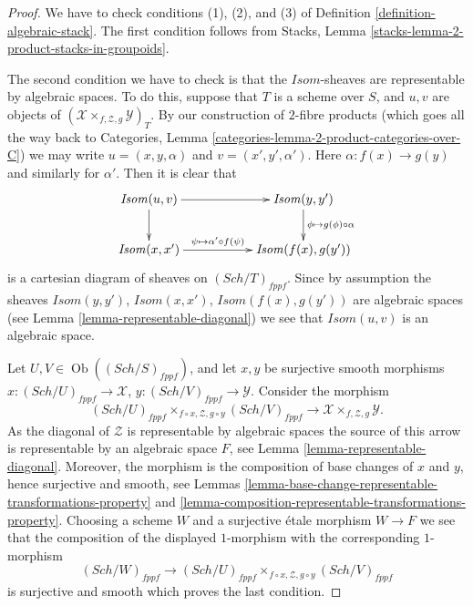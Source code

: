 \documentclass{stacks-project}
\theoremstyle{plain}
\theoremstyle{definition}
\theoremstyle{remark}
\numberwithin{equation}{subsection}
\def\Sch{\mathit{Sch}}
\def\Ob{\mathop{\mathrm{Ob}}\nolimits}
\begin{document}
\begin{proof}
We have to check conditions (1), (2), and (3) of
Definition \ref{definition-algebraic-stack}.
The first condition follows from
Stacks, Lemma \ref{stacks-lemma-2-product-stacks-in-groupoids}.

\medskip\noindent
The second condition we have to check is that the $\mathit{Isom}$-sheaves
are representable by algebraic spaces. To do this, suppose that
$T$ is a scheme over $S$, and $u, v$ are objects of
$(\mathcal{X} \times_{f, \mathcal{Z}, g} \mathcal{Y})_T$.
By our construction of $2$-fibre products (which goes all the way
back to
Categories, Lemma \ref{categories-lemma-2-product-categories-over-C})
we may write $u = (x, y, \alpha)$ and $v = (x', y', \alpha')$.
Here $\alpha : f(x) \to g(y)$ and similarly for $\alpha'$.
Then it is clear that
$$
\xymatrix{
\mathit{Isom}(u, v) \ar[d] \ar[rr] & &
\mathit{Isom}(y, y') \ar[d]^{\phi \mapsto g(\phi) \circ \alpha} \\
\mathit{Isom}(x, x') \ar[rr]^-{\psi \mapsto \alpha' \circ f(\psi)} & &
\mathit{Isom}(f(x), g(y'))
}
$$
is a cartesian diagram of sheaves on $(\Sch/T)_{fppf}$.
Since by assumption the sheaves
$\mathit{Isom}(y, y')$, $\mathit{Isom}(x, x')$, $\mathit{Isom}(f(x), g(y'))$
are algebraic spaces (see
Lemma \ref{lemma-representable-diagonal})
we see that $\mathit{Isom}(u, v)$
is an algebraic space.

\medskip\noindent
Let $U, V \in \Ob((\Sch/S)_{fppf})$,
and let $x, y$ be surjective smooth morphisms
$x : (\Sch/U)_{fppf} \to \mathcal{X}$,
$y : (\Sch/V)_{fppf} \to \mathcal{Y}$.
Consider the morphism
$$
(\Sch/U)_{fppf}
\times_{f \circ x, \mathcal{Z}, g \circ y}
(\Sch/V)_{fppf}
\longrightarrow
\mathcal{X} \times_{f, \mathcal{Z}, g} \mathcal{Y}.
$$
As the diagonal of $\mathcal{Z}$ is representable by algebraic spaces
the source of this arrow is representable by an algebraic space $F$, see
Lemma \ref{lemma-representable-diagonal}.
Moreover, the morphism is the composition
of base changes of $x$ and $y$, hence surjective and smooth, see
Lemmas \ref{lemma-base-change-representable-transformations-property} and
\ref{lemma-composition-representable-transformations-property}.
Choosing a scheme $W$ and a surjective \'etale morphism $W \to F$
we see that the composition of the displayed $1$-morphism
with the corresponding $1$-morphism
$$
(\Sch/W)_{fppf}
\longrightarrow
(\Sch/U)_{fppf}
\times_{f \circ x, \mathcal{Z}, g \circ y}
(\Sch/V)_{fppf}
$$
is surjective and smooth which proves the last condition.
\end{proof}
\end{document}
